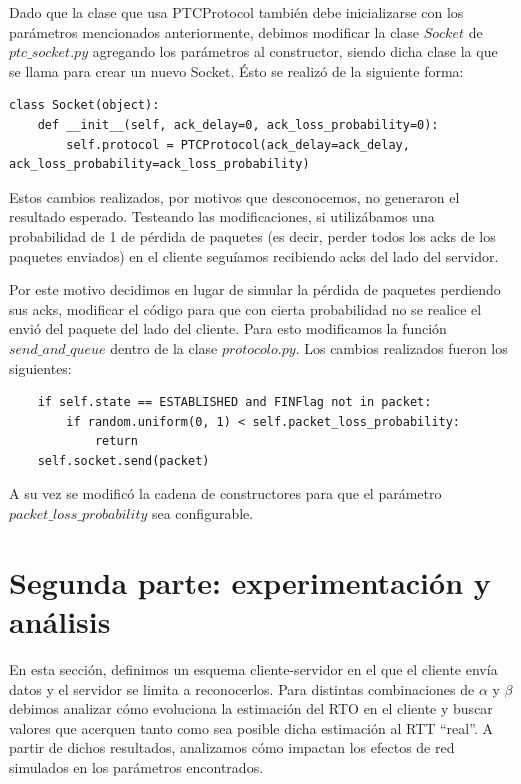 \documentclass[10pt, a4paper]{article}
\begin{document}
Dado que la clase que usa PTCProtocol también debe inicializarse con los parámetros mencionados anteriormente, debimos modificar la clase $Socket$ de $ptc\_socket.py$ agregando los parámetros al constructor, siendo dicha clase la que se llama para crear un nuevo Socket. Ésto se realizó de la siguiente forma:
\begin{verbatim}
class Socket(object):
    def __init__(self, ack_delay=0, ack_loss_probability=0):
		self.protocol = PTCProtocol(ack_delay=ack_delay, ack_loss_probability=ack_loss_probability)
\end{verbatim}

Estos cambios realizados, por motivos que desconocemos, no generaron el resultado esperado. Testeando las modificaciones, si utilizábamos una probabilidad de 1 de pérdida de paquetes (es decir, perder todos los acks de los paquetes enviados) en el cliente seguíamos recibiendo acks del lado del servidor.

Por este motivo decidimos en lugar de simular la pérdida de paquetes perdiendo sus acks, modificar el código para que con cierta probabilidad no se realice el envió del paquete del lado del cliente.
 Para esto modificamos la función $send\_and\_queue$ dentro de la clase $protocolo.py$. Los cambios realizados fueron los siguientes:
 
 \begin{verbatim}
  	if self.state == ESTABLISHED and FINFlag not in packet:
		if random.uniform(0, 1) < self.packet_loss_probability:    
			return
	self.socket.send(packet)
 \end{verbatim}

A su vez se modificó la cadena de constructores para que el parámetro $packet\_loss\_probability$ sea configurable.

\section{Segunda parte: experimentación y análisis}

En esta sección, definimos un esquema cliente-servidor en el que el cliente envía datos y el servidor se limita a reconocerlos. Para distintas combinaciones de $\alpha$ y $\beta$ debimos analizar cómo evoluciona la estimación del RTO en el cliente y buscar valores que acerquen tanto como sea posible dicha estimación al RTT ``real''. A partir de dichos resultados, analizamos cómo impactan los efectos de red simulados en los parámetros encontrados.

\end{document}
